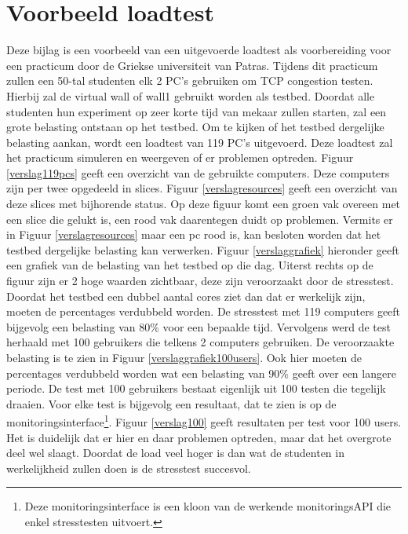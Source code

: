 \chapter{Voorbeeld loadtest}
\npar
Deze bijlag is een voorbeeld van een uitgevoerde loadtest als voorbereiding voor een practicum door de Griekse universiteit van Patras. Tijdens dit practicum zullen een 50-tal studenten elk 2 PC's gebruiken om TCP congestion testen. Hierbij zal de virtual wall of wall1 gebruikt worden als testbed. Doordat alle studenten hun experiment op zeer korte tijd van mekaar zullen starten, zal een grote belasting ontstaan op het testbed. Om te kijken of het testbed dergelijke belasting aankan, wordt een loadtest van 119 PC's uitgevoerd. Deze loadtest zal het practicum simuleren en weergeven of er problemen optreden. 
\npar
Figuur \ref{verslag119pcs} geeft een overzicht van de gebruikte computers. Deze computers zijn per twee opgedeeld in slices. Figuur \ref{verslagresources} geeft een overzicht van deze slices met bijhorende status. Op deze figuur komt een groen vak overeen met een slice die gelukt is, een rood vak daarentegen duidt op problemen.
\npar
Vermits er in Figuur \ref{verslagresources} maar een pc rood is, kan besloten worden dat het testbed dergelijke belasting kan verwerken. Figuur \ref{verslaggrafiek} hieronder geeft een grafiek van de belasting van het testbed op die dag. Uiterst rechts op de figuur zijn er 2 hoge waarden zichtbaar, deze zijn veroorzaakt door de stresstest. Doordat het testbed een dubbel aantal cores ziet dan dat er werkelijk zijn, moeten de percentages verdubbeld worden. De stresstest met 119 computers geeft bijgevolg een belasting van 80\% voor een bepaalde tijd.
\clearpage
\npar
Vervolgens werd de test herhaald met 100 gebruikers die telkens 2 computers gebruiken. De veroorzaakte belasting is te zien in Figuur \ref{verslaggrafiek100users}. Ook hier moeten de percentages verdubbeld worden wat een belasting van 90\% geeft over een langere periode.
\npar
De test met 100 gebruikers bestaat eigenlijk uit 100 testen die tegelijk draaien. Voor elke test is bijgevolg een resultaat, dat te zien is op de monitoringsinterface\footnote{Deze monitoringsinterface is een kloon van de werkende monitoringsAPI die enkel stresstesten uitvoert.}. Figuur \ref{verslag100} geeft resultaten per test voor 100 users. Het is duidelijk dat er hier en daar problemen optreden, maar dat het overgrote deel wel slaagt.
\npar
Doordat de load veel hoger is dan wat de studenten in werkelijkheid zullen doen is de stresstest succesvol. 
